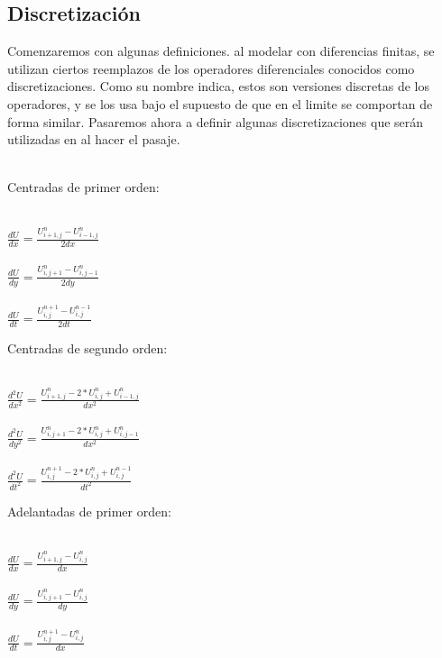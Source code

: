 \subsection{Discretización}
Comenzaremos con algunas definiciones. al modelar con diferencias finitas, se utilizan ciertos reemplazos de los operadores diferenciales conocidos como discretizaciones. Como su nombre indica, estos son versiones discretas de los operadores, y se los usa bajo el supuesto de que en el limite se comportan de forma similar. Pasaremos ahora a definir algunas discretizaciones que serán utilizadas en al hacer el pasaje.
~\\
~\\
\begin{minipage}{\linewidth}

Centradas de primer orden:
\begin{center}

~\\
$\frac{dU}{dx} = \frac{U^{n}_{i+1,j} - U^{n}_{i-1,j}}{2dx} $
~\\
~\\
$\frac{dU}{dy} = \frac{U^{n}_{i,j+1} - U^{n}_{i,j-1}}{2dy} $
~\\
~\\
$\frac{dU}{dt} = \frac{U^{n+1}_{i,j} - U^{n-1}_{i,j}}{2dt} $
~\\
\end{center}

\end{minipage}
\begin{minipage}{\linewidth}



Centradas de segundo orden:
\begin{center}

~\\
$\frac{d^{2}U}{dx^{2}} = \frac{ U^{n}_{i+1,j} - 2*U^{n}_{i,j} + U^{n}_{i-1,j}}{dx^2}$
~\\
~\\
$\frac{d^{2}U}{dy^{2}} = \frac{ U^{n}_{i,j+1} - 2*U^{n}_{i,j} + U^{n}_{i,j-1}}{dx^2}$
~\\
~\\
$\frac{d^{2}U}{dt^{2}} = \frac{ U^{n+1}_{i,j} - 2*U^{n}_{i,j} + U^{n-1}_{i,j}}{dt^2}$
~\\
\end{center}

\end{minipage}
\begin{minipage}{\linewidth}

Adelantadas de primer orden:
\begin{center}

~\\
$\frac{dU}{dx} = \frac{U^{n}_{i+1,j} - U^{n}_{i,j}}{dx} $
~\\
~\\
$\frac{dU}{dy} = \frac{U^{n}_{i,j+1} - U^{n}_{i,j}}{dy} $
~\\
~\\
$\frac{dU}{dt} = \frac{U^{n+1}_{i,j} - U^{n}_{i,j}}{dx} $
~\\
\end{center}

\end{minipage}
